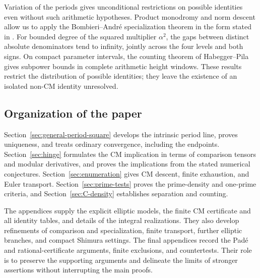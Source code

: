 Variation of the periods gives unconditional restrictions on possible
identities even without such arithmetic hypotheses. Product monodromy
and norm descent allow us to apply the Bombieri--Andr\'e specialization
theorem in the form stated in \cite{BaldiBinyaminiUrbanik2026}.
For bounded degree of the squared multiplier $\alpha^2$, the gaps
between distinct absolute denominators tend to infinity, jointly
across the four levels and both signs. On compact parameter intervals,
the counting theorem of Habegger--Pila \cite{HabeggerPilaCounting}
gives subpower bounds in complete arithmetic height windows. These
results restrict the distribution of possible identities; they leave
the existence of an isolated non-CM identity unresolved.

\subsection{Organization of the paper}
Section~\ref{sec:general-period-square} develops the intrinsic period
line, proves uniqueness, and treats ordinary convergence, including
the endpoints. Section~\ref{sec:hinge} formulates the CM implication
in terms of comparison tensors and modular derivatives, and proves
the implications from the stated numerical conjectures.
Section~\ref{sec:enumeration} gives CM descent, finite exhaustion,
and Euler transport. Section~\ref{sec:prime-tests} proves the
prime-density and one-prime criteria, and Section~\ref{sec:C-density}
establishes separation and counting.

The appendices supply the explicit elliptic models, the finite CM
certificate and all identity tables, and details of the integral
realizations. They also develop refinements of comparison and
specialization, finite transport, further elliptic branches, and
compact Shimura settings. The final appendices record the Pad\'e and
rational-certificate arguments, finite exclusions, and countertests.
Their role is to preserve the supporting arguments and delineate the
limits of stronger assertions without interrupting the main proofs.

